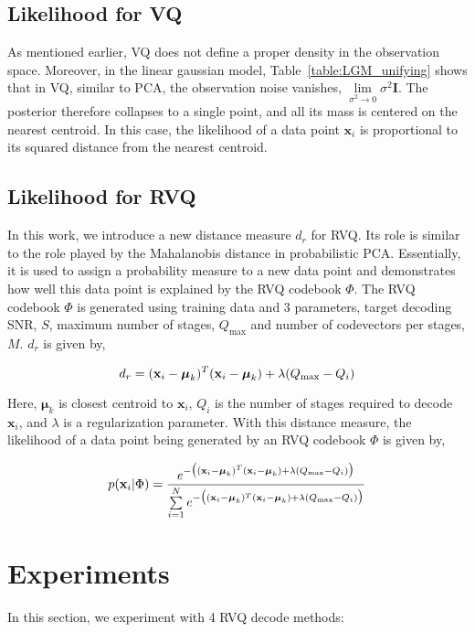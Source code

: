\subsection{Likelihood for VQ}
As mentioned earlier, VQ does not define a proper density in the observation space.  Moreover, in the linear gaussian model, Table~\ref{table:LGM_unifying} shows that in VQ, similar to PCA, the observation noise vanishes, $\lim\limits_{\sigma^2 \rightarrow 0} \sigma^2\mathbf{I}$.  The posterior therefore collapses to a single point, and all its mass is centered on the nearest centroid.  In this case, the likelihood of a data point $\mathbf{x}_i$ is proportional to its squared distance from the nearest centroid.

\subsection{Likelihood for RVQ}
In this work, we introduce a new distance measure $d_r$ for RVQ.  Its role is similar to the role played by the Mahalanobis distance in probabilistic PCA.  Essentially, it is used to assign a probability measure to a new data point and demonstrates how well this data point is explained by the RVQ codebook $\Phi$.  The RVQ codebook $\Phi$ is generated using training data and 3 parameters, target decoding SNR, $S$, maximum number of stages, $Q_{\textrm{max}}$ and number of codevectors per stages, $M$.  $d_r$ is given by,




\begin{equation}
d_r = (\mathbf{x}_i-\boldsymbol\mu_k)^T(\mathbf{x}_i-\boldsymbol\mu_k) + \lambda({Q_{\textrm{max}}-Q_i})
\end{equation}

Here, $\boldsymbol\mu_k$ is closest centroid to $\mathbf{x}_i$, $Q_i$ is the number of stages required to decode $\mathbf{x}_i$, and $\lambda$ is a regularization parameter.  With this distance measure, the likelihood of a data point being generated by an RVQ codebook $\Phi$ is given by,

\begin{equation}
p(\mathbf{x}_i|\Phi) = \frac{e^{-\big((\mathbf{x}_i-\boldsymbol\mu_k)^T(\mathbf{x}_i-\boldsymbol\mu_k) + \lambda({Q_{\textrm{max}}-Q_i})\big)}} {\sum\limits_{i=1}^N e^{-\big((\mathbf{x}_i-\boldsymbol\mu_k)^T(\mathbf{x}_i-\boldsymbol\mu_k) + \lambda({Q_{\textrm{max}}-Q_i})\big)}}
\end{equation}

\section{Experiments}
In this section, we experiment with 4 RVQ decode methods:


